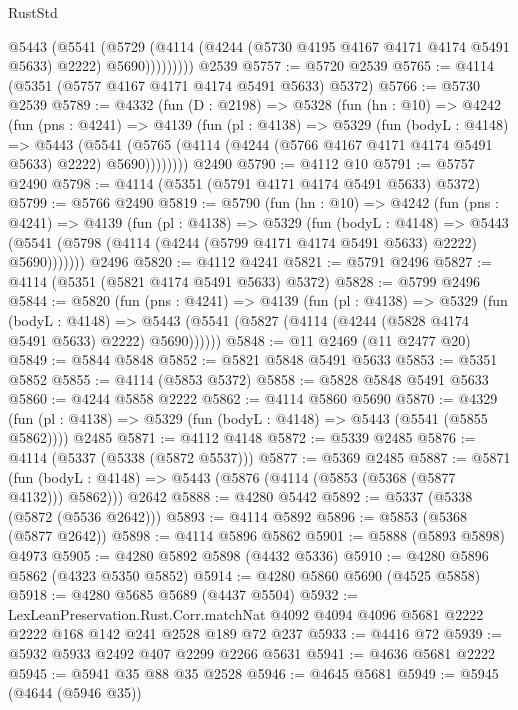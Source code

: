 \begin{lexlean}{RustStd}
\begin{coremodule}
{\begin{coremodule}
{{{{{{{{{{{{{{              @5443
                (@5541
                  (@5729
                    (@4114 (@4244 (@5730 @4195 @4167 @4171 @4174 @5491 @5633) @2222) @5690)))))))))
    @2539
@5757 := @5720 @2539
@5765 := @4114 (@5351 (@5757 @4167 @4171 @4174 @5491 @5633) @5372)
@5766 := @5730 @2539
@5789 := @4332
    (fun (D : @2198) =>
    @5328
      (fun (hn : @10) =>
      @4242
        (fun (pns : @4241) =>
        @4139
          (fun (pl : @4138) =>
          @5329
            (fun (bodyL : @4148) =>
            @5443
              (@5541 (@5765 (@4114 (@4244 (@5766 @4167 @4171 @4174 @5491 @5633) @2222) @5690))))))))
    @2490
@5790 := @4112 @10
@5791 := @5757 @2490
@5798 := @4114 (@5351 (@5791 @4171 @4174 @5491 @5633) @5372)
@5799 := @5766 @2490
@5819 := @5790
    (fun (hn : @10) =>
    @4242
      (fun (pns : @4241) =>
      @4139
        (fun (pl : @4138) =>
        @5329
          (fun (bodyL : @4148) =>
          @5443 (@5541 (@5798 (@4114 (@4244 (@5799 @4171 @4174 @5491 @5633) @2222) @5690)))))))
    @2496
@5820 := @4112 @4241
@5821 := @5791 @2496
@5827 := @4114 (@5351 (@5821 @4174 @5491 @5633) @5372)
@5828 := @5799 @2496
@5844 := @5820
    (fun (pns : @4241) =>
    @4139
      (fun (pl : @4138) =>
      @5329
        (fun (bodyL : @4148) =>
        @5443 (@5541 (@5827 (@4114 (@4244 (@5828 @4174 @5491 @5633) @2222) @5690))))))
@5848 := @11 @2469 (@11 @2477 @20)
@5849 := @5844 @5848
@5852 := @5821 @5848 @5491 @5633
@5853 := @5351 @5852
@5855 := @4114 (@5853 @5372)
@5858 := @5828 @5848 @5491 @5633
@5860 := @4244 @5858 @2222
@5862 := @4114 @5860 @5690
@5870 := @4329
    (fun (pl : @4138) => @5329 (fun (bodyL : @4148) => @5443 (@5541 (@5855 @5862))))
    @2485
@5871 := @4112 @4148
@5872 := @5339 @2485
@5876 := @4114 (@5337 (@5338 (@5872 @5537)))
@5877 := @5369 @2485
@5887 := @5871
    (fun (bodyL : @4148) => @5443 (@5876 (@4114 (@5853 (@5368 (@5877 @4132))) @5862)))
    @2642
@5888 := @4280 @5442
@5892 := @5337 (@5338 (@5872 (@5536 @2642)))
@5893 := @4114 @5892
@5896 := @5853 (@5368 (@5877 @2642))
@5898 := @4114 @5896 @5862
@5901 := @5888 (@5893 @5898) @4973
@5905 := @4280 @5892 @5898 (@4432 @5336)
@5910 := @4280 @5896 @5862 (@4323 @5350 @5852)
@5914 := @4280 @5860 @5690 (@4525 @5858)
@5918 := @4280 @5685 @5689 (@4437 @5504)
@5932 := LexLeanPreservation.Rust.Corr.matchNat
    @4092
    @4094
    @4096
    @5681
    @2222
    @2222
    @168
    @142
    @241
    @2528
    @189
    @72
    @237
@5933 := @4416 @72
@5939 := @5932 @5933 @2492 @407 @2299 @2266 @5631
@5941 := @4636 @5681 @2222
@5945 := @5941 @35 @88 @35 @2528
@5946 := @4645 @5681
@5949 := @5945 (@4644 (@5946 @35))
}}}}}}}}}}}}}}
\end{coremodule}}
\end{coremodule}
\end{lexlean}
